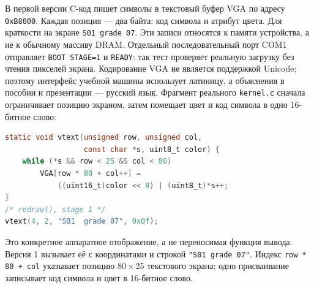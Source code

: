 В первой версии C-код пишет символы в текстовый буфер VGA по адресу
\texttt{0xB8000}. Каждая позиция --- два байта: код символа и атрибут цвета.
Для краткости на экране \texttt{S01 grade 07}. Эти записи относятся
к памяти устройства, а не к обычному массиву DRAM. Отдельный последовательный
порт COM1 отправляет \texttt{BOOT STAGE=1} и \texttt{READY}: так тест
проверяет реальную загрузку без чтения пикселей экрана. Кодирование VGA
не является поддержкой Unicode; поэтому интерфейс учебной машины использует
латиницу, а объяснения в пособии и презентации --- русский язык.
Фрагмент реального \texttt{kernel.c} сначала ограничивает позицию экраном,
затем помещает цвет и код символа в одно 16-битное слово:
\begin{lstlisting}[language=C,basicstyle=\ttfamily\small]
static void vtext(unsigned row, unsigned col,
                  const char *s, uint8_t color) {
    while (*s && row < 25 && col < 80)
        VGA[row * 80 + col++] =
            ((uint16_t)color << 8) | (uint8_t)*s++;
}
/* redraw(), stage 1 */
vtext(4, 2, "S01  grade 07", 0x0f);
\end{lstlisting}
Это конкретное аппаратное отображение, а не переносимая функция вывода.
Версия 1 вызывает её с координатами и строкой
\texttt{"S01  grade 07"}. Индекс \texttt{row * 80 + col} указывает
позицию 80\,$\times$\,25 текстового экрана; одно присваивание записывает
код символа и цвет в 16-битное слово.

